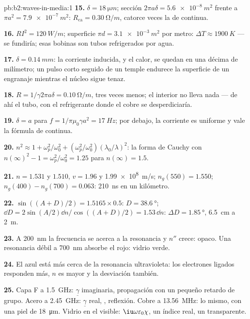 \begin{solution}{pb:b2:waves-in-media:1}
\textbf{15.} $\delta = \qty{18}{\micro m}$; sección $2\pi a\delta = \qty{5.6e-8}{m^2}$ frente a
$\pi a^2 = \qty{7.9e-7}{m^2}$: $R_{\text{ca}} = \qty{0.30}{\ohm/m}$, catorce veces la de continua.

\textbf{16.} $RI^2 = \qty{120}{W/m}$; superficie $\pi d = \qty{3.1e-3}{m^2}$ por metro:
$\Delta T \approx \qty{1900}{K}$ --- se fundiría; esas bobinas son tubos refrigerados por agua.

\textbf{17.} $\delta = \qty{0.14}{mm}$: la corriente inducida, y el calor, se quedan
en una décima de milímetro; un pulso corto seguido de un temple endurece
la superficie de un engranaje mientras el núcleo sigue tenaz.

\textbf{18.} $R = 1/\gamma2\pi a\delta = \qty{0.10}{\ohm/m}$, tres veces menos; el
interior no lleva nada --- de ahí el tubo, con el refrigerante donde el
cobre se desperdiciaría.

\textbf{19.} $\delta = a$ para $f = 1/\pi\mu_0\gamma a^2 = \qty{17}{Hz}$; por debajo, la corriente es
uniforme y vale la fórmula de continua.

\textbf{20.} $n^2 \approx 1 + \omega_p^2/\omega_0^2 + (\omega_p^2/\omega_0^2)(\lambda_0/\lambda)^2$: la forma de Cauchy
con $n(\infty)^2 - 1 = \omega_p^2/\omega_0^2 = 1.25$ para $n(\infty) = 1.5$.

\textbf{21.} $n = 1.531$ y $1.510$, $v = 1.96$ y \qty{1.99e8}{m/s}; $n_g(550) =
1.550$; $n_g(400) - n_g(700) = 0.063$: \qty{210}{ns} en un kilómetro.

\textbf{22.} $\sin((A + D)/2) = 1.5165 \times 0.5$: $D = \qty{38.6}{\degree}$; $\dd D = 2\sin
(A/2)\dd n/\cos((A + D)/2) = 1.53\,\dd n$: $\Delta D = \qty{1.85}{\degree}$, \qty{6.5}{cm} a \qty{2}{m}.

\textbf{23.} A \qty{200}{nm} la frecuencia se acerca a la resonancia y
$n''$ crece: opaco. Una resonancia débil a \qty{700}{nm} absorbe el rojo:
vidrio verde.

\textbf{24.} El azul está más cerca de la resonancia ultravioleta: los electrones
ligados responden más, $n$ es mayor y la desviación también.

\textbf{25.} Capa F a \qty{1.5}{GHz}: $\underline\gamma$ imaginaria, propagación
con un pequeño retardo de grupo. Acero a \qty{2.45}{GHz}: $\underline\gamma$ real, , reflexión. Cobre a \qty{13.56}{MHz}: lo mismo, con una piel de
\qty{18}{\micro m}. Vidrio en el visible: $\iu\omega\varepsilon_0\chi$, un índice real, un
 transparente.
\end{solution}
